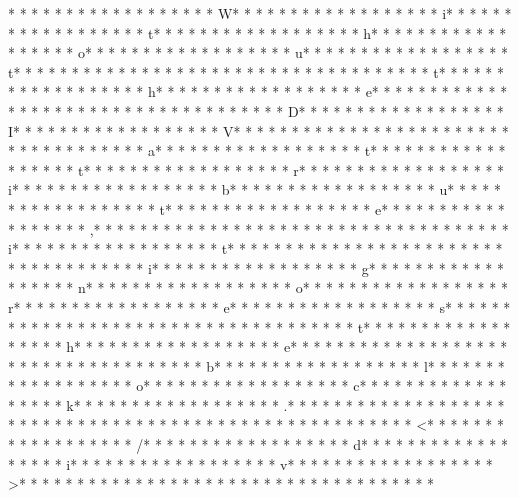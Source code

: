 * * *  * * *  * * *  *  * * *  *  * * *  * W* * *  * * *  * * *  *  * * *  *  * * *  * i* * *  * * *  * * *  *  * * *  *  * * *  * t* * *  * * *  * * *  *  * * *  *  * * *  * h* * *  * * *  * * *  *  * * *  *  * * *  * o* * *  * * *  * * *  *  * * *  *  * * *  * u* * *  * * *  * * *  *  * * *  *  * * *  * t* * *  * * *  * * *  *  * * *  *  * * *  *  * * *  * * *  * * *  *  * * *  *  * * *  * t* * *  * * *  * * *  *  * * *  *  * * *  * h* * *  * * *  * * *  *  * * *  *  * * *  * e* * *  * * *  * * *  *  * * *  *  * * *  *  * * *  * * *  * * *  *  * * *  *  * * *  * D* * *  * * *  * * *  *  * * *  *  * * *  * I* * *  * * *  * * *  *  * * *  *  * * *  * V* * *  * * *  * * *  *  * * *  *  * * *  *  * * *  * * *  * * *  *  * * *  *  * * *  * a* * *  * * *  * * *  *  * * *  *  * * *  * t* * *  * * *  * * *  *  * * *  *  * * *  * t* * *  * * *  * * *  *  * * *  *  * * *  * r* * *  * * *  * * *  *  * * *  *  * * *  * i* * *  * * *  * * *  *  * * *  *  * * *  * b* * *  * * *  * * *  *  * * *  *  * * *  * u* * *  * * *  * * *  *  * * *  *  * * *  * t* * *  * * *  * * *  *  * * *  *  * * *  * e* * *  * * *  * * *  *  * * *  *  * * *  * ,* * *  * * *  * * *  *  * * *  *  * * *  *  * * *  * * *  * * *  *  * * *  *  * * *  * i* * *  * * *  * * *  *  * * *  *  * * *  * t* * *  * * *  * * *  *  * * *  *  * * *  *  * * *  * * *  * * *  *  * * *  *  * * *  * i* * *  * * *  * * *  *  * * *  *  * * *  * g* * *  * * *  * * *  *  * * *  *  * * *  * n* * *  * * *  * * *  *  * * *  *  * * *  * o* * *  * * *  * * *  *  * * *  *  * * *  * r* * *  * * *  * * *  *  * * *  *  * * *  * e* * *  * * *  * * *  *  * * *  *  * * *  * s* * *  * * *  * * *  *  * * *  *  * * *  *  * * *  * * *  * * *  *  * * *  *  * * *  * t* * *  * * *  * * *  *  * * *  *  * * *  * h* * *  * * *  * * *  *  * * *  *  * * *  * e* * *  * * *  * * *  *  * * *  *  * * *  *  * * *  * * *  * * *  *  * * *  *  * * *  * b* * *  * * *  * * *  *  * * *  *  * * *  * l* * *  * * *  * * *  *  * * *  *  * * *  * o* * *  * * *  * * *  *  * * *  *  * * *  * c* * *  * * *  * * *  *  * * *  *  * * *  * k* * *  * * *  * * *  *  * * *  *  * * *  * .* * *  * * *  * * *  *  * * *  *  * * *  *  * * *  * * *  * * *  *  * * *  *  * * *  * 
* * *  * * *  * * *  *  * * *  *  * * *  * <* * *  * * *  * * *  *  * * *  *  * * *  * /* * *  * * *  * * *  *  * * *  *  * * *  * d* * *  * * *  * * *  *  * * *  *  * * *  * i* * *  * * *  * * *  *  * * *  *  * * *  * v* * *  * * *  * * *  *  * * *  *  * * *  * >* * *  * * *  * * *  *  * * *  *  * * *  * 
* * *  * * *  * * *  *  * * *  *  * * *  * 
